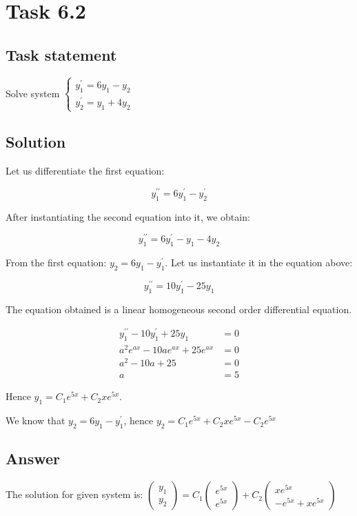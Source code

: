 \section*{Task 6.2}

\subsection*{Task statement}

Solve system $\begin{cases}
    y_1^{\prime} = 6y_1 - y_2 \\
    y_2^{\prime} = y_1 + 4y_2
\end{cases}$

\subsection*{Solution}

Let us differentiate the first equation:

\[y_1^{\prime \prime} = 6y_1^{\prime} - y_2^{\prime}\]

After instantiating the second equation into it, we obtain:

\[y_1^{\prime \prime} = 6y_1^{\prime} - y_1 - 4y_2\]

From the first equation: $y_2 = 6y_1 - y_1^{\prime}$. Let us instantiate it in the equation above:

\[y_1^{\prime \prime} = 10y_1^{\prime} - 25y_1\]

The equation obtained is a linear homogeneous second order differential equation.

\begin{displaymath}
    \begin{aligned}
        y_1^{\prime \prime} - 10y_1^{\prime} + 25y_1 & = 0 \\ 
        a^2 e^{ax} - 10a e^{ax} + 25 e^{ax} & = 0 \\
        a^2 - 10a + 25 & = 0 \\
        a & = 5
    \end{aligned}
\end{displaymath}

Hence $y_1 = C_1 e^{5x} + C_2 x e^{5x}$.

We know that $y_2 = 6y_1 - y_1^{\prime}$, hence $y_2 = C_1 e^{5x} + C_2 x e^{5x} - C_2 e^{5x}$

\subsection*{Answer}

The solution for given system is: $\begin{pmatrix}
y_1 \\ y_2
\end{pmatrix} = C_1 \begin{pmatrix}
    e^{5x} \\ e^{5x}
\end{pmatrix} + C_2 \begin{pmatrix}
    x e^{5x} \\ -e^{5x} + x e^{5x}
\end{pmatrix}$